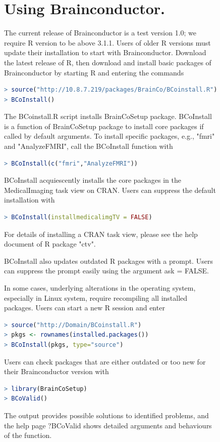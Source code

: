 \documentclass{nature}
\begin{document}
{\begin{figure}[tb]
\begin{methods}
\section{Using Brainconductor.}
The current release of Brainconductor is a test version
1.0; we require R version to be above 3.1.1. Users of older R versions must
update their installation to start with Brainconductor. Download the latest
release of R, then download and install basic packages of Brainconductor by
starting R and entering the commands
\begin{lstlisting}[language = R]
> source("http://10.8.7.219/packages/BrainCo/BCoinstall.R")
> BCoInstall()
\end{lstlisting}
The BCoinstall.R script installs BrainCoSetup package. BCoInstall is a function
of BrainCoSetup package to install core packages if called by default arguments.
To install specific packages, e.g., "fmri" and "AnalyzeFMRI", call the
BCoInstall function with
\begin{lstlisting}[language = R]
> BCoInstall(c("fmri","AnalyzeFMRI"))
\end{lstlisting}
BCoInstall acquiescently installs the core packages in the MedicalImaging task
view on CRAN. Users can suppress the default installation with
\begin{lstlisting}[language = R]
> BCoInstall(installmedicalimgTV = FALSE)
\end{lstlisting}
For details of installing a CRAN task view, please see the help document of R
package "ctv".

BCoInstall also updates outdated R packages with a prompt. Users can suppress
the prompt easily using the argument ask = FALSE.

In some cases, underlying alterations in the operating system, especially in
Linux system, require recompiling all installed packages. Users can start a new
R session and enter
\begin{lstlisting}[language = R]
> source("http://Domain/BCoinstall.R")
> pkgs <- rownames(installed.packages())
> BCoInstall(pkgs, type="source")
\end{lstlisting}

Users can check packages that are either outdated or too new for their
Brainconductor version with
\begin{lstlisting}[language = R]
> library(BrainCoSetup)
> BCoValid()
\end{lstlisting}
The output provides possible solutions to identified problems, and the help page
?BCoValid shows detailed arguments and behaviours of the function.






\end{methods}
\end{figure}}
\end{document}
